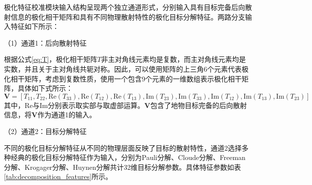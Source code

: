极化特征校准模块输入结构呈现两个独立通道形式，分别输入具有目标完备后向散射信息的极化相干矩阵和具有不同物理散射特性的极化目标分解特征。两路分支输入特征如下所示：

（1）通道1：后向散射特征

根据公式\ref{eq:T}，极化相干矩阵$T$非主对角线元素均是复数，而主对角线元素均是实数，并且关于主对角线共轭对称。因此，可以使用矩阵的上三角6个元素代表极化相干矩阵，考虑到复数性质，使用一个包含9个元素的一维数组表示极化相干矩阵，具体如下式所示：
\begin{equation}
    \mathbf{V}=[T_{11}, T_{22}, \text{Re}(T_{33}), \text{Re}(T_{12}), \text{Re}(T_{13}), \text{Im}(T_{23}), \text{Im}(T_{33}), \text{Im}(T_{12}), \text{Im}(T_{13}), \text{Im}(T_{23})]
\end{equation}
其中，$\text{Re}$与$\text{Im}$分别表示取实部与取虚部运算。$\mathbf{V}$包含了地物目标完备的后向散射信息，将$\mathbf{V}$作为通道1的输入。

（2）通道2：目标分解特征

不同的极化目标分解特征从不同的物理层面反映了目标的散射特性，通道2选择多种经典的极化目标分解特征作为输入，分别为Pauli分解、Cloude分解、Freeman分解、Krogager分解、Huynen分解共计32维目标分解参数。具体特征参数如表\ref{tab:decomposition_features}所示。

